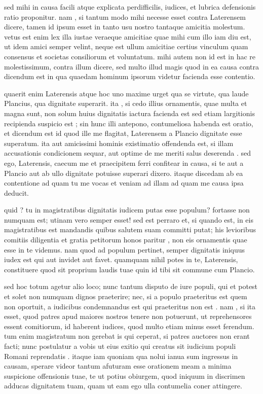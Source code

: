  sed mihi in causa facili atque explicata perdifficilis, iudices, et lubrica defensionis ratio proponitur. nam , si tantum modo mihi necesse esset contra Laterensem dicere, tamen id ipsum esset in tanto usu nostro tantaque amicitia molestum. vetus est enim lex illa iustae veraeque amicitiae quae mihi cum illo iam diu est, ut idem amici semper velint, neque est ullum amicitiae certius vinculum quam consensus et societas consiliorum et voluntatum. mihi autem non id est in hac re molestissimum, contra illum dicere, sed multo illud magis quod in ea causa contra dicendum est in qua quaedam hominum ipsorum videtur facienda esse contentio.

 quaerit enim Laterensis atque hoc uno maxime urget qua se virtute, qua laude Plancius, qua dignitate superarit. ita , si cedo illius ornamentis, quae multa et magna sunt, non solum huius dignitatis iactura facienda est sed etiam largitionis recipienda suspicio est ; sin hunc illi antepono, contumeliosa habenda est oratio, et dicendum est id quod ille me flagitat, Laterensem a Plancio dignitate esse superatum. ita aut amicissimi hominis existimatio offendenda est, si illam accusationis condicionem sequar, aut optime de me meriti salus deserenda . sed ego, Laterensis, caecum me et praecipitem ferri confitear in causa, si te aut a Plancio aut ab ullo dignitate potuisse superari dixero. itaque discedam ab ea contentione ad quam tu me vocas et veniam ad illam ad quam me causa ipsa deducit.

 quid ? tu in magistratibus dignitatis iudicem putas esse populum? fortasse non numquam est; utinam vero semper esset! sed est perraro et, si quando est, in eis magistratibus est mandandis quibus salutem suam committi putat; his levioribus comitiis diligentia et gratia petitorum honos paritur , non eis ornamentis quae esse in te videmus. nam quod ad populum pertinet, semper dignitatis iniquus iudex est qui aut invidet aut favet. quamquam nihil potes in te, Laterensis, constituere quod sit proprium laudis tuae quin id tibi sit commune cum Plancio.

 sed hoc totum agetur alio loco; nunc tantum disputo de iure populi, qui et potest et solet non numquam dignos praeterire; nec, si a populo praeteritus est quem non oportuit, a iudicibus condemnandus est qui praeteritus non est . nam , si ita esset, quod patres apud maiores nostros tenere non potuerunt, ut reprehensores essent comitiorum, id haberent iudices, quod multo etiam minus esset ferendum. tum enim magistratum non gerebat is qui ceperat, si patres auctores non erant facti; nunc postulatur a vobis ut eius exitio qui creatus sit iudicium populi Romani reprendatis . itaque iam quoniam qua nolui ianua sum ingressus in causam, sperare videor tantum afuturam esse orationem meam a minima suspicione offensionis tuae, te ut potius obiurgem, quod iniquum in discrimen adducas dignitatem tuam, quam ut eam ego ulla contumelia coner attingere.

